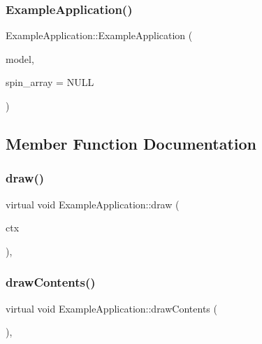 \subsubsection{\texorpdfstring{Example\+Application()}{ExampleApplication()}\hspace{0.1cm}{\footnotesize\ttfamily [2/2]}}
{\footnotesize\ttfamily Example\+Application\+::\+Example\+Application (\begin{DoxyParamCaption}\item[{\mbox{\hyperlink{classIsingModel}{Ising\+Model}}$<$ float $>$ $\ast$}]{model,  }\item[{\mbox{\hyperlink{classSpinArray}{Spin\+Array}}$<$ float $>$ $\ast$}]{spin\+\_\+array = {\ttfamily NULL} }\end{DoxyParamCaption})\hspace{0.3cm}{\ttfamily [inline]}}



\subsection{Member Function Documentation}
\mbox{\label{classExampleApplication_a4fa26138de0a6f65e6b1ccae17f26f9d}} 
\subsubsection{\texorpdfstring{draw()}{draw()}}
{\footnotesize\ttfamily virtual void Example\+Application\+::draw (\begin{DoxyParamCaption}\item[{N\+V\+Gcontext $\ast$}]{ctx }\end{DoxyParamCaption})\hspace{0.3cm}{\ttfamily [inline]}, {\ttfamily [virtual]}}

\mbox{\label{classExampleApplication_a75d765000cca185faf56af2db9472d19}} 
\subsubsection{\texorpdfstring{draw\+Contents()}{drawContents()}}
{\footnotesize\ttfamily virtual void Example\+Application\+::draw\+Contents (\begin{DoxyParamCaption}{ }\end{DoxyParamCaption})\hspace{0.3cm}{\ttfamily [inline]}, {\ttfamily [virtual]}}

